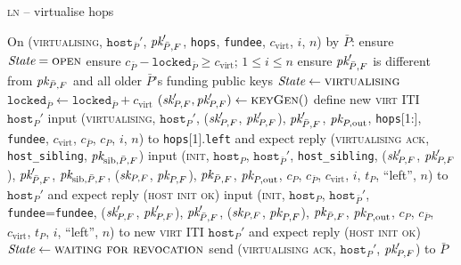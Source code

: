\begin{center}
  \begin{processbox}{\textsc{ln} -- virtualise hops}
    \begin{algorithmic}[1]
      \State On (\textsc{virtualising}, $\texttt{host}_{\bar{P}}'$,
      $\textit{pk}_{\bar{P}, F}'$, \texttt{hops}, \texttt{fundee}, $c_{\mathrm{virt}}$,
      $i$, $n$) by $\bar{P}$:
      \Indent
        \State ensure $\itistate = \textsc{open}$
        \State ensure $c_{\bar{P}} - \texttt{locked}_{\bar{P}} \geq
        c_{\mathrm{virt}}$; $1 \leq i \leq n$
        \State ensure $\textit{pk}_{\bar{P}, F}'$ is different from $\textit{pk}_{\bar{P}, F}$ and
        all older $\bar{P}$'s funding public keys
        \State $\itistate \gets \textsc{virtualising}$
        \State $\texttt{locked}_{\bar{P}} \gets \texttt{locked}_{\bar{P}} +
        c_{\mathrm{virt}}$
        \State $(\textit{sk}_{P, F}', \textit{pk}_{P, F}') \gets \textsc{keyGen}()$
         
          \State define new \textsc{virt} ITI $\texttt{host}_P'$
          \State input (\textsc{virtualising}, $\texttt{host}_P'$, ($\textit{sk}_{P,
          F}'$, $\textit{pk}_{P, F}'$), $\textit{pk}_{\bar{P}, F}'$, $\textit{pk}_{P, \mathrm{out}}$,
          \texttt{hops}[1:], \texttt{fundee}, $c_{\mathrm{virt}}$,
          $c_{\bar{P}}$, $c_P$, $i$, $n$) to \texttt{hops}[1].\texttt{left} and
          expect reply (\textsc{virtualising ack}, \texttt{host\_sibling},
          $\textit{pk}_{\mathrm{sib}, \bar{P}, F}$)
          \State input (\textsc{init}, $\texttt{host}_P$,
          $\texttt{host}_{\bar{P}}'$, \texttt{host\_sibling}, ($\textit{sk}_{P, F}'$,
          $\textit{pk}_{P, F}'$), $\textit{pk}_{\bar{P}, F}'$, $\textit{pk}_{\mathrm{sib}, \bar{P}, F}$,
          ($\textit{sk}_{P, F}$, $\textit{pk}_{P, F}$), $\textit{pk}_{\bar{P}, F}$, $\textit{pk}_{P, \mathrm{out}}$,
          $c_P$, $c_{\bar{P}}$, $c_{\mathrm{virt}}$, $i$, $t_P$, ``left'', $n$)
          to $\texttt{host}_P'$ and expect reply (\textsc{host init ok})
        \Else \: 
          \State input (\textsc{init}, $\texttt{host}_P$,
          $\texttt{host}_{\bar{P}}'$, \texttt{fundee}=\texttt{fundee}, ($\textit{sk}_{P,
          F}'$, $\textit{pk}_{P, F}'$), $\textit{pk}_{\bar{P}, F}'$, ($\textit{sk}_{P, F}$, $\textit{pk}_{P, F}$),
          $\textit{pk}_{\bar{P}, F}$, $\textit{pk}_{P, \mathrm{out}}$, $c_P$, $c_{\bar{P}}$,
          $c_{\mathrm{virt}}$, $t_P$, $i$, ``left'', $n$) to new \textsc{virt}
          ITI $\texttt{host}_P'$ and expect reply (\textsc{host init ok})
        \EndIf
        \State $\itistate \gets \textsc{waiting for revocation}$
        \State send (\textsc{virtualising ack}, $\texttt{host}_P'$, $\textit{pk}_{P, F}'$)
        to $\bar{P}$
      \EndIndent
      \Statex


\end{algorithmic}
\end{processbox}
\end{center}
